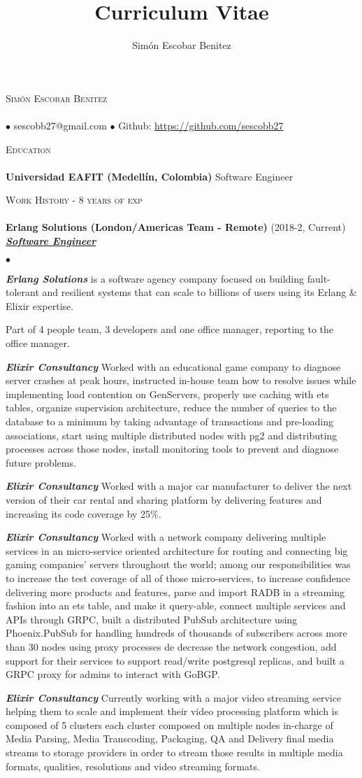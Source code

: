\documentclass[a4paper]{article}
\title{Curriculum Vitae}
\author{Sim\'on Escobar Benitez}
\newcommand{\lineunder}{\vspace*{-8pt} \\ \hspace*{-18pt} \hrulefill \\}
\newcommand{\header}[1]{{\hspace*{-15pt}\vspace*{6pt}
  \textsc{#1}} \vspace*{-6pt} \lineunder}
\newcommand{\employer}[3]{{
  \textbf{#1} (#2)\\ \underline{\textbf{\emph{#3}}}\\ }}
\newcommand{\contact}[2]{
  \vspace*{-8pt}
  \begin{center}
  {\LARGE \scshape {#1}} \lineunder #2
  \end{center}
  \vspace*{-8pt} }
\newenvironment{achievements}{\begin{list}{$\bullet$}{\topsep 0pt \itemsep
  -2pt}}{\vspace*{4pt}\end{list}}
\newcommand{\schoolwithcourses}[2]{
  \textbf{#1} #2
  \vspace*{5pt} }
\newcommand{\emphasys}[1]{\textbf{\emph{#1}}}
\begin{document}
  \small
  \smallskip
  \vspace*{-44pt}
  \contact{Sim\'on Escobar Benitez} { $\bullet$ sescobb27@gmail.com $\bullet$ Github: \url{https://github.com/sescobb27} }
  \header{Education}
  \schoolwithcourses{Universidad EAFIT (Medell\'in, Colombia)}{Software Engineer}

  \header{Work History - 8 years of exp}

  \employer{ Erlang Solutions (London/Americas Team - Remote)}{2018-2, Current}{Software Engineer}
  \begin{achievements}
  \item \emphasys{Erlang Solutions} is a software agency company focused on building fault-tolerant and resilient systems that can scale to billions of users using its Erlang \& Elixir expertise.
  \item Part of 4 people team, 3 developers and one office manager, reporting to the office manager.
  \item \emphasys{Elixir Consultancy} Worked with an educational game company to diagnose server crashes at peak hours, instructed in-house team how to resolve issues while implementing load contention on GenServers, properly use caching with ets tables, organize supervision architecture, reduce the number of queries to the database to a minimum by taking advantage of transactions and pre-loading associations, start using multiple distributed nodes with pg2 and distributing processes across those nodes, install monitoring tools to prevent and diagnose future problems.
  \item \emphasys{Elixir Consultancy} Worked with a major car manufacturer to deliver the next version of their car rental and sharing platform by delivering features and increasing its code coverage by 25\%.
  \item \emphasys{Elixir Consultancy} Worked with a network company delivering multiple services in an micro-service oriented architecture for routing and connecting big gaming companies’ servers throughout the world; among our responsibilities was to increase the test coverage of all of those micro-services, to increase confidence delivering more products and features, parse and import RADB in a streaming fashion into an ets table, and make it query-able, connect multiple services and APIs through GRPC, built a distributed PubSub architecture using Phoenix.PubSub for handling hundreds of thousands of subscribers across more than 30 nodes using proxy processes de decrease the network congestion, add support for their services to support read/write postgresql replicas, and built a GRPC proxy for admins to interact with GoBGP.
  \item \emphasys{Elixir Consultancy} Currently working with a major video streaming service helping them to scale and implement their video processing platform which is composed of 5 clusters each cluster composed on multiple nodes in-charge of Media Parsing, Media Transcoding, Packaging, QA and Delivery final media streams to storage providers in order to stream those results in multiple media formats, qualities, resolutions and video streaming formats.
  \end{achievements}
\end{document}
